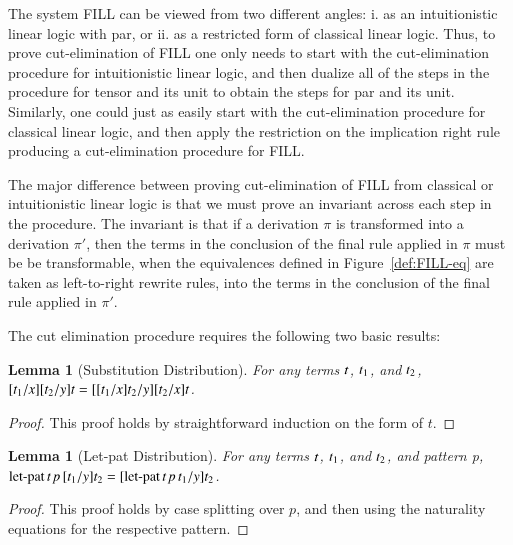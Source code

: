 \documentclass{elsarticle}
\newtheorem{lemma}[theorem]{Lemma}
\begin{document}
The system FILL can be viewed from two different angles: i. as an intuitionistic
linear logic with par, or ii. as a restricted form of classical linear
logic.  Thus, to prove cut-elimination of FILL one only needs to start
with the cut-elimination procedure for intuitionistic linear logic,
and then dualize all of the steps in the procedure for tensor and its
unit to obtain the steps for par and its unit.  Similarly, one could
just as easily start with the cut-elimination procedure for classical
linear logic, and then apply the restriction on the implication right
rule producing a cut-elimination procedure for FILL.

The major difference between proving cut-elimination of FILL from
classical or intuitionistic linear logic is that we must prove an
invariant across each step in the procedure.  The invariant is that if
a derivation $\pi$ is transformed into a derivation $\pi'$, then the
terms in the conclusion of the final rule applied in $\pi$ must be be
transformable, when the equivalences defined in
Figure~\ref{def:FILL-eq} are taken as left-to-right rewrite rules,
into the terms in the conclusion of the final rule applied in $\pi'$.

\begin{report}
  The cut elimination procedure requires the following two basic
results:
\begin{lemma}[Substitution Distribution]
  \label{lemma:substitution_distribution}
  For any terms $\mathit{t}$, $\mathit{t_{{\mathrm{1}}}}$, and $\mathit{t_{{\mathrm{2}}}}$, $[  \mathit{t_{{\mathrm{1}}}}  /  \mathit{x}  ]  [  \mathit{t_{{\mathrm{2}}}}  /  \mathit{y}  ]  \mathit{t} = [  [  \mathit{t_{{\mathrm{1}}}}  /  \mathit{x}  ]  \mathit{t_{{\mathrm{2}}}}  /  \mathit{y}  ]  [  \mathit{t_{{\mathrm{2}}}}  /  \mathit{x}  ]  \mathit{t}$.
\end{lemma}
\begin{proof}
  This proof holds by straightforward induction on the form of $t$.
\end{proof}

\begin{lemma}[Let-pat Distribution]
  \label{lemma:let-pat_distribution}
  For any terms $\mathit{t}$, $\mathit{t_{{\mathrm{1}}}}$, and $\mathit{t_{{\mathrm{2}}}}$, and pattern p, \\
  $ \mathsf{\operatorname{let-pat} }\, \mathit{t} \, \mathit{p} \, [  \mathit{t_{{\mathrm{1}}}}  /  \mathit{y}  ]  \mathit{t_{{\mathrm{2}}}}  = [   \mathsf{\operatorname{let-pat} }\, \mathit{t} \, \mathit{p} \, \mathit{t_{{\mathrm{1}}}}   /  \mathit{y}  ]  \mathit{t_{{\mathrm{2}}}}$.
\end{lemma}
\begin{proof}
  This proof holds by case splitting over $p$, and then using the
  naturality equations for the respective pattern.
\end{proof}
\end{report}
\end{document}
